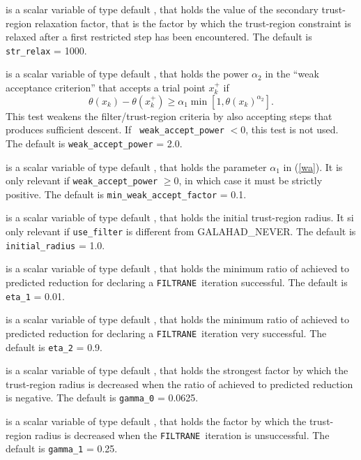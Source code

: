 \documentclass{galahad}
\newcommand{\packagename}{FILTRANE}
\newcommand{\sym}{\sf\small}
\newcommand{\filtrane}{{\tt \packagename}}
\begin{document}
\begin{description}
 is a scalar variable of type default \realdp, that holds the
value of the secondary trust-region relaxation factor, that is the factor by
which the trust-region constraint is relaxed after a first restricted step has
been encountered.
The default is {\tt str\_relax} = 1000.

 is a scalar variable of type default \realdp, 
that holds the power $\alpha_2$ in the ``weak acceptance criterion'' that
accepts a trial point $x_k^+$ if
\begin{equation}\label{wa}
\theta(x_k)-\theta(x_k^+) \geq 
\alpha_1 \min\left[ 1, \theta(x_k)^{\alpha_2} \right]. 
\end{equation}
This test weakens the filter/trust-region criteria 
by also accepting steps that produces sufficient descent.  If {\tt
weak\_accept\_power} $<0$, this test is not used.
The default is {\tt weak\_accept\_power} = 2.0.

 is a scalar variable of type default \realdp, 
that holds the parameter $\alpha_1$ in (\ref{wa}).  It is only relevant
if {\tt weak\_accept\_power} $\geq 0$, in which case it must be strictly
positive.
The default is {\tt min\_weak\_accept\_factor} = 0.1.

 is a scalar variable of type default \realdp, that
holds the initial trust-region radius. It si only relevant if
{\tt use\_filter} is different from {\sym GALAHAD\_NEVER}.
The default is {\tt initial\_radius} = 1.0.

 is a scalar variable of type default \realdp, that holds the
minimum ratio of achieved to predicted reduction
for declaring a \filtrane\ iteration successful.
The default is {\tt eta\_1} = 0.01.

 is a scalar variable of type default \realdp, that holds the
minimum ratio of achieved to predicted reduction
for declaring a \filtrane\ iteration very successful.
The default is {\tt eta\_2} = 0.9.

 is a scalar variable of type default \realdp, that holds the
strongest factor by which the trust-region radius is decreased when the ratio
of achieved to predicted reduction is negative.
The default is {\tt gamma\_0} = 0.0625.

 is a scalar variable of type default \realdp, that holds the
factor by which the trust-region radius is decreased when the \filtrane\
iteration is unsuccessful.
The default is {\tt gamma\_1} = 0.25.


\end{description}
\end{document}
